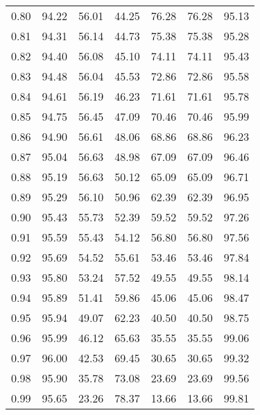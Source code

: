\begin{tabular}{|c|c|c|c|c|c|c|}
      0.80 &     94.22 &     56.01 &      44.25 &   76.28 &      76.28 &         95.13 \\
      0.81 &     94.31 &     56.14 &      44.73 &   75.38 &      75.38 &         95.28 \\
      0.82 &     94.40 &     56.08 &      45.10 &   74.11 &      74.11 &         95.43 \\
      0.83 &     94.48 &     56.04 &      45.53 &   72.86 &      72.86 &         95.58 \\
      0.84 &     94.61 &     56.19 &      46.23 &   71.61 &      71.61 &         95.78 \\
      0.85 &     94.75 &     56.45 &      47.09 &   70.46 &      70.46 &         95.99 \\
      0.86 &     94.90 &     56.61 &      48.06 &   68.86 &      68.86 &         96.23 \\
      0.87 &     95.04 &     56.63 &      48.98 &   67.09 &      67.09 &         96.46 \\
      0.88 &     95.19 &     56.63 &      50.12 &   65.09 &      65.09 &         96.71 \\
      0.89 &     95.29 &     56.10 &      50.96 &   62.39 &      62.39 &         96.95 \\
      0.90 &     95.43 &     55.73 &      52.39 &   59.52 &      59.52 &         97.26 \\
      0.91 &     95.59 &     55.43 &      54.12 &   56.80 &      56.80 &         97.56 \\
      0.92 &     95.69 &     54.52 &      55.61 &   53.46 &      53.46 &         97.84 \\
      0.93 &     95.80 &     53.24 &      57.52 &   49.55 &      49.55 &         98.14 \\
      0.94 &     95.89 &     51.41 &      59.86 &   45.06 &      45.06 &         98.47 \\
      0.95 &     95.94 &     49.07 &      62.23 &   40.50 &      40.50 &         98.75 \\
      0.96 &     95.99 &     46.12 &      65.63 &   35.55 &      35.55 &         99.06 \\
      0.97 &     96.00 &     42.53 &      69.45 &   30.65 &      30.65 &         99.32 \\
      0.98 &     95.90 &     35.78 &      73.08 &   23.69 &      23.69 &         99.56 \\
      0.99 &     95.65 &     23.26 &      78.37 &   13.66 &      13.66 &         99.81 \\
\bottomrule
\end{tabular}
